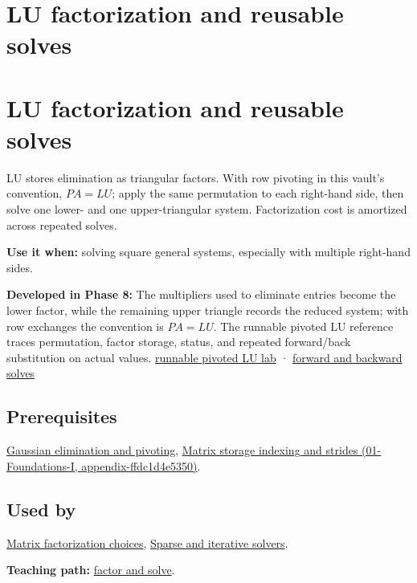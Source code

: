 \hypertarget{appendix-55e4b5b0a1e6}{}
\section*{LU factorization and reusable solves}
\section{LU factorization and reusable solves}\label{lu-factorization-and-reusable-solves}

LU stores elimination as triangular factors. With row pivoting in this vault's convention, \(PA=LU\); apply the same permutation to each right-hand side, then solve one lower- and one upper-triangular system. Factorization cost is amortized across repeated solves.

\textbf{Use it when:} solving square general systems, especially with multiple right-hand sides.

\textbf{Developed in Phase 8:} The multipliers used to eliminate entries become the lower factor, while the remaining upper triangle records the reduced system; with row exchanges the convention is \(PA=LU\). The runnable pivoted LU reference traces permutation, factor storage, status, and repeated forward/back substitution on actual values. \href{Continuous\%20Notes/Computing\%20Foundations\%20-\%20From\%20Bits\%20to\%20C++\%20and\%20Systems\%20APIs\#A\%20runnable\%20pivoted\%20LU\%20reference\%20preserves\%20the\%20elimination\%20history}{runnable pivoted LU lab} · \href{Continuous\%20Notes/Computing\%20Foundations\%20-\%20From\%20Bits\%20to\%20C++\%20and\%20Systems\%20APIs\#Triangular\%20solves\%20perform\%20the\%20cheap\%20second\%20half}{forward and backward solves}

\subsection{Prerequisites}\label{prerequisites}

\hyperref[appendix-f6e77f4a200f]{Gaussian elimination and pivoting}, \href{}{Matrix storage indexing and strides (01-Foundations-I, appendix-ffdc1d4e5350)}.

\subsection{Used by}\label{used-by}

\hyperref[appendix-221a483bec2d]{Matrix factorization choices}, \hyperref[appendix-67c87a3d9e94]{Sparse and iterative solvers}.

\textbf{Teaching path:} \href{Continuous\%20Notes/Computing\%20Foundations\%20-\%20From\%20Bits\%20to\%20C++\%20and\%20Systems\%20APIs\#Elimination\%20turns\%20the\%20geometry\%20into\%20an\%20auditable\%20calculation}{factor and solve}.
